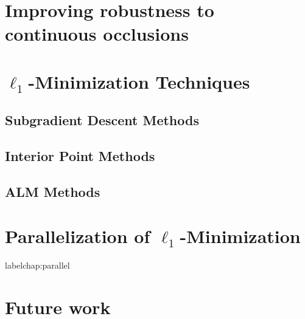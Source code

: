 \documentclass[draftthesis,tocnosub,noragright,centerchapter,12pt]{uiucecethesis09}
\begin{document}
\chapter{Improving robustness to continuous occlusions}
\label{chap:iccv}


\chapter{$\ell_1$-Minimization Techniques}
\label{chap:minimization}
%
\section{Subgradient Descent Methods}
\section{Interior Point Methods}
\section{ALM Methods}

\chapter{Parallelization of $\ell_1$-Minimization}
label{chap:parallel}


\chapter{Future work}
\label{chap:future}
%

\appendix 
%

\backmatter



\end{document}
